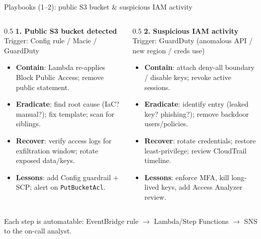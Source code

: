 \documentclass[aspectratio=169,10pt]{beamer}
\newcommand{\term}[1]{{\color{awsink}\textbf{#1}}}
\begin{document}
\begin{frame}{Playbooks (1--2): public S3 bucket \& suspicious IAM activity}
  \footnotesize
  \begin{columns}[T]
    \begin{column}{0.5\textwidth}
      \textbf{\color{accent}1. Public S3 bucket detected}\\
      {\tiny Trigger: Config rule / Macie / GuardDuty}
      \begin{itemize}\setlength\itemsep{0pt}
        \item \term{Contain}: Lambda re-applies Block Public Access; remove public statement.
        \item \term{Eradicate}: find root cause (IaC? manual?); fix template; scan for siblings.
        \item \term{Recover}: verify access logs for exfiltration window; rotate exposed data/keys.
        \item \term{Lessons}: add Config guardrail + SCP; alert on \texttt{PutBucketAcl}.
      \end{itemize}
    \end{column}
    \begin{column}{0.5\textwidth}
      \textbf{\color{accent}2. Suspicious IAM activity}\\
      {\tiny Trigger: GuardDuty (anomalous API / new region / creds use)}
      \begin{itemize}\setlength\itemsep{0pt}
        \item \term{Contain}: attach deny-all boundary / disable keys; revoke active sessions.
        \item \term{Eradicate}: identify entry (leaked key? phishing?); remove backdoor users/policies.
        \item \term{Recover}: rotate credentials; restore least-privilege; review CloudTrail timeline.
        \item \term{Lessons}: enforce MFA, kill long-lived keys, add Access Analyzer review.
      \end{itemize}
    \end{column}
  \end{columns}
  \vfill
  {\tiny\color{midgray}Each step is automatable: EventBridge rule $\to$ Lambda/Step Functions $\to$ SNS to the on-call analyst.}
\end{frame}
\end{document}
